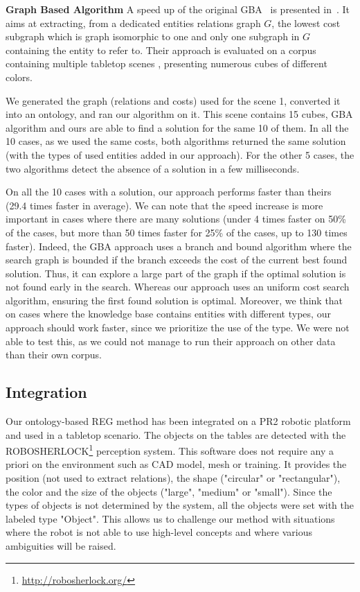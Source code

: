 \documentclass[a4paper,11pt,twoside]{StyleThese}
\begin{document}
\textbf{Graph Based Algorithm}
A speed up of the original GBA~\cite{viethen2013graphs} is presented in~\cite{li2017automatically}. It aims at extracting, from a dedicated entities relations graph $G$, the lowest cost subgraph which is graph isomorphic to one and only one subgraph in $G$ containing the entity to refer to.
Their approach is evaluated on a corpus containing multiple tabletop scenes \cite{li2016spatial}, presenting numerous cubes of different colors.

We generated the graph (relations and costs) used for the scene 1, converted it into an ontology, and ran our algorithm on it.
This scene contains 15 cubes, GBA algorithm and ours are able to find a solution for the same 10 of them. In all the 10 cases, as we used the same costs, both algorithms returned the same solution (with the types of used entities added in our approach). 
For the other 5 cases, the two algorithms detect the absence of a solution in a few milliseconds.

On all the 10 cases with a solution, our approach performs faster than theirs (29.4 times faster in average). We can note that the speed increase is more important in cases where there are many solutions (under 4 times faster on 50\% of the cases, but more than 50 times faster for 25\% of the cases, up to 130 times faster). 
Indeed, the GBA approach uses a branch and bound algorithm where the search graph is bounded if the branch exceeds the cost of the current best found solution. Thus, it can explore a large part of the graph if the optimal solution is not found early in the search. Whereas our approach uses an uniform cost search algorithm, ensuring the first found solution is optimal.
Moreover, we think that on cases where the knowledge base contains entities with different types, our approach should work faster, since we prioritize the use of the type. We were not able to test this, as we could not manage to run their approach on other data than their own corpus.

\subsection{Integration}

Our ontology-based REG method has been integrated on a PR2 robotic platform and used in a tabletop scenario. %
The objects on the tables are detected with the ROBOSHERLOCK\footnote{\url{http://robosherlock.org/}} \cite{beetz2015robosherlock} perception system. This software does not require any a priori on the environment such as CAD model, mesh or training. 
It provides the position (not used to extract relations), the shape ("circular" or "rectangular"), the color and the size of the objects ("large", "medium" or "small"). Since the types of objects is not determined by the system, all the objects were set with the labeled type "Object". This allows us to challenge our method with situations where the robot is not able to use high-level concepts and where various ambiguities will be raised.
\end{document}
